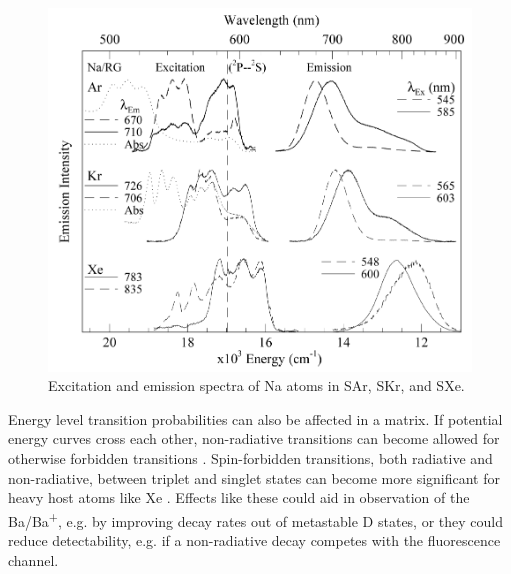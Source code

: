 \begin{figure} %
        \centering
                \includegraphics[width=.7\textwidth]{figures/Na_in_matrices.png}
                \caption{Excitation and emission spectra of Na atoms in SAr, SKr, and SXe.  \cite{matrixNa}}
\label{fig:matrixNa}
\end{figure}



Energy level transition probabilities can also be affected in a matrix.  If potential energy curves cross each other, non-radiative transitions can become allowed for otherwise forbidden transitions \cite{crepin}.  Spin-forbidden transitions, both radiative and non-radiative, between triplet and singlet states can become more significant for heavy host atoms like Xe \cite{heavyAtom}.  Effects like these could aid in observation of the Ba/Ba\textsuperscript{+}, e.g. by improving decay rates out of metastable D states, or they could reduce detectability, e.g. if a non-radiative decay competes with the fluorescence channel.

